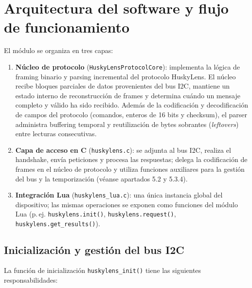 \documentclass{prgrado}
\begin{document}
\section{Arquitectura del software y flujo de funcionamiento}

El módulo se organiza en tres capas:

\begin{enumerate}[noitemsep]
  \item \textbf{Núcleo de protocolo} (\texttt{HuskyLensProtocolCore}): implementa la lógica de framing binario y parsing incremental del protocolo
HuskyLens. El núcleo recibe bloques parciales de datos provenientes del bus I2C,
mantiene un estado interno de reconstrucción de frames y determina cuándo un
mensaje completo y válido ha sido recibido. Además de la codificación y
decodificación de campos del protocolo (comandos, enteros de 16 bits y checksum),
el parser administra buffering temporal y reutilización de bytes sobrantes
(\textit{leftovers}) entre lecturas consecutivas.
  \item \textbf{Capa de acceso en C} (\texttt{huskylens.c}): se adjunta al bus I2C, realiza el handshake, envía peticiones y procesa las respuestas; delega la codificación de frames en el núcleo de protocolo y utiliza funciones auxiliares para la gestión del bus y la temporización (véanse apartados 5.2 y 5.3.4).
  \item \textbf{Integración Lua} (\texttt{huskylens\_lua.c}): una única instancia global del dispositivo; las mismas operaciones se exponen como funciones del módulo Lua (p.\,ej. \texttt{huskylens.init()}, \texttt{huskylens.request()}, \texttt{huskylens.get\_results()}).
\end{enumerate}

\subsection{Inicialización y gestión del bus I2C}

La función de inicialización \texttt{huskylens\_init()} tiene las siguientes responsabilidades:
\end{document}

